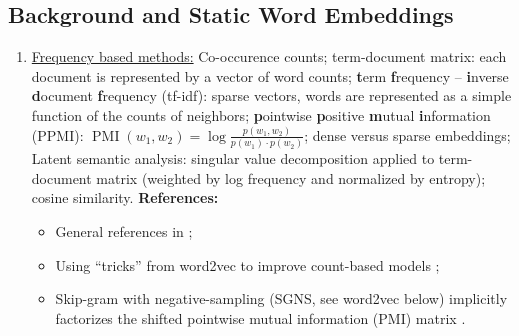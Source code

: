 \documentclass[11pt, a4paper]{amsart}
\begin{document}
\subsection{Background and Static Word Embeddings}
\label{sec:static_word_embeddings}

\begin{enumerate}
    \item \underline{Frequency based methods:}
    \newline
    Co-occurence counts;
    term-document matrix: each document is represented by a vector of word counts;
    \textbf{t}erm \textbf{f}requency -- \textbf{i}nverse \textbf{d}ocument \textbf{f}requency (tf-idf):
    sparse vectors, words are represented as a simple function of the counts of neighbors;
    \textbf{p}ointwise \textbf{p}ositive \textbf{m}utual \textbf{i}nformation (PPMI):
    $\operatorname{PMI}(w_{1}, w_{2}) = \log \frac{p(w_{1}, w_{2})}{p(w_{1}) \cdot p(w_{2})}$;
    dense versus sparse embeddings;
    Latent semantic analysis:
    singular value decomposition applied to term-document matrix (weighted by log frequency and normalized by entropy);
    cosine similarity.
    \newline
    \textbf{References:}
    \begin{itemize}
        \item General references in ;
        \item Using ``tricks'' from word2vec to improve count-based models \cite{levy-etal-2015-improving};
        \item Skip-gram with negative-sampling (SGNS, see word2vec below) implicitly factorizes the shifted pointwise mutual information (PMI) matrix \cite{NIPS2014_feab05aa}.
    \end{itemize}
    

\end{enumerate}
\end{document}
